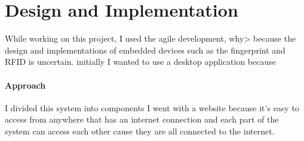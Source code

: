 \chapter{Design and Implementation}
While working on this project, I used the agile development, why> because the design and implementations of embedded devices such as the fingerprint and RFID is uncertain.  initially I wanted to use a desktop application because 


\subsubsection{Approach}

I divided this system into components 
I went with a website because it's easy to access from anywhere that has an internet connection and each part of the system can access each other cause they are all connected to the internet. 